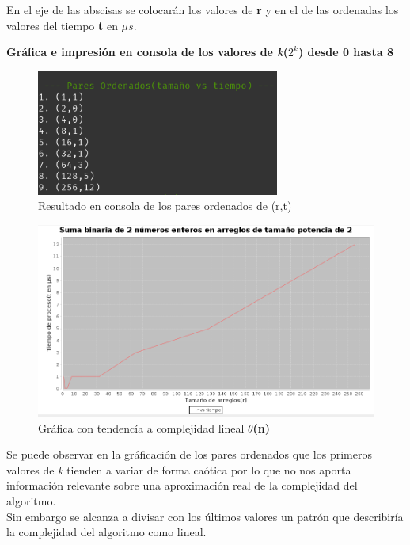\documentclass{report}
\begin{document}
            En el eje de las abscisas se colocarán los valores de \textbf{r} y en el de las ordenadas los valores del tiempo \textbf{t} en $\mu s$.
            
            \begin{center}
                \textbf{Gráfica e impresión en consola de los valores de \textit{k}($2^k$) desde 0 hasta 8}
                
            \begin{figure}[!h]
            	\centering
            	\includegraphics[width=8cm]{Imagenes/Binarios-R-1.png}
                \caption{Resultado en consola de los pares ordenados de (r,t)}
            \end{figure}
            
            \begin{figure}[!h]
            	\centering
            	\includegraphics[width=13cm]{Imagenes/Binarios-G-1.png}
                \caption{Gráfica con tendencía a complejidad lineal \textbf{$\theta$(n)}}
            \end{figure}
            
            Se puede observar en la gráficación de los pares ordenados que los primeros valores de \textit{k} tienden a variar de forma caótica por lo que no nos aporta información relevante sobre una aproximación real de la complejidad del algoritmo.\\
            Sin embargo se alcanza a divisar con los últimos valores un patrón que describiría la complejidad del algoritmo como lineal.
            

\end{center}
\end{document}
